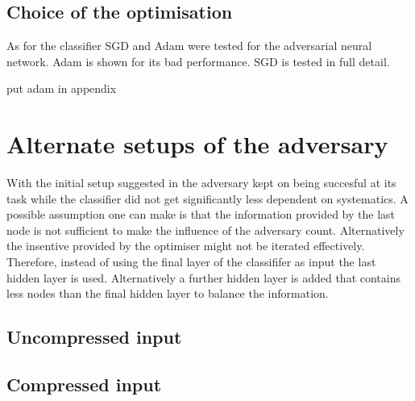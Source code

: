 \subsection{Choice of the optimisation}

As for the classifier SGD and Adam were tested for the adversarial neural network. Adam is shown for its bad performance. SGD is tested in full detail.

put adam in appendix

\section{Alternate setups of the adversary}

With the initial setup suggested in the adversary kept on being succesful at its task while the classifier did not get significantly less dependent on systematics. A possible assumption one can make is that the information provided by the last node is not sufficient to make the influence of the adversary count. Alternatively the insentive provided by the optimiser might not be iterated effectively. Therefore, instead of using the final layer of the classififer as input the last hidden layer is used. Alternatively a further hidden layer is added that contains less nodes than the final hidden layer to balance the information.

\subsection{Uncompressed input}

\subsection{Compressed input}
